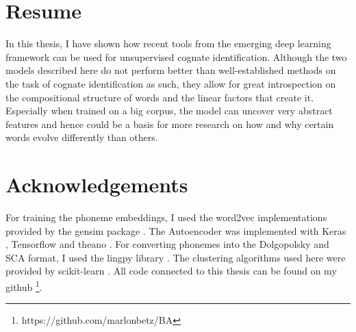 \documentclass[6pt]{article}
\begin{document}
%
%
\section{Resume}

In this thesis, I have shown how recent tools from the emerging deep learning framework can be used for unsupervised cognate identification. Although the two models described here do not perform better than well-established methods on the task of cognate identification as such, they allow for great introspection on the compositional structure of words and the linear factors that create it. Especially when trained on a big corpus, the model can uncover very abstract features and hence could be a basis for more research on how and why certain words evolve differently than others. 
\section{Acknowledgements}
For training the phoneme embeddings, I used the word2vec implementations provided by the gensim package \citep{rehurek_lrec}. The Autoencoder was implemented with Keras \citep{chollet2015keras}, Tensorflow \citep{tensorflow2015-whitepaper} and theano \citep{2016arXiv160502688short}. For converting phonemes into the Dolgopolsky and SCA format, I used the lingpy library \citep{List2016e}. The clustering algorithms used here were provided by scikit-learn \citep{scikit-learn}. All code connected to this thesis can be found on my github \footnote{https://github.com/marlonbetz/BA}.




\end{document}
